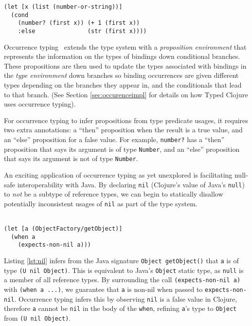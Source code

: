 \begin{lstlisting}[caption=A well typed form utilising occurrence typing with Clojure syntax, label=lst:occ1]
(let [x (list (number-or-string))]
  (cond 
    (number? (first x)) (+ 1 (first x))
    :else               (str (first x))))
\end{lstlisting}

Occurrence typing~\cite{TF08,TF10} extends the type 
system with a \emph{proposition environment} that represents 
the information on the types of bindings down conditional branches.
These propositions are then used to update the types associated
with bindings in the \emph{type environment} down branches
so binding occurrences are given different types 
depending on the branches they appear in, and the conditionals
that lead to that branch.
(See Section \ref{sec:occurenceimpl} for details on how Typed Clojure uses occurrence typing).

For occurrence typing to infer propositions from type predicate usages, it requires 
two extra annotations: a ``then'' proposition
when the result is a true value, and an ``else'' proposition for a false value.
For example, \lstinline|number?| has a ``then'' proposition that says its argument
is of type \lstinline|Number|, and an ``else'' proposition that says its argument is not of type \lstinline|Number|.

An exciting application of occurrence typing as yet unexplored is facilitating null-safe interoperability with Java.
By declaring \lstinline|nil| (Clojure's value of Java's \lstinline|null|) to \emph{not} be a subtype of reference types,
we can begin to statically disallow potentially inconsistent usages of \lstinline|nil| as part of the type system.
\\\\

\begin{lstlisting}[caption=Observing nil-checks using occurrence typing, label=lst:nil]
(let [a (ObjectFactory/getObject)]
  (when a
    (expects-non-nil a)))
\end{lstlisting}

Listing \ref{lst:nil} infers from the Java signature \lstinline|Object getObject()|
that \lstinline|a| is of type \lstinline|(U nil Object)|. This is equivalent to Java's
\lstinline|Object| static type, as \lstinline|null| is a member of all reference types. By surrounding
the call \lstinline|(expects-non-nil a)| with \lstinline|(when a ...)|, we guarantee that
\lstinline|a| is non-nil when passed to \lstinline|expects-non-nil|. Occurrence typing infers
this by observing \lstinline|nil| is a false value in Clojure, therefore \lstinline|a| cannot
be \lstinline|nil| in the body of the \lstinline|when|, refining \lstinline|a|'s type to \lstinline|Object|
from \lstinline|(U nil Object)|.

